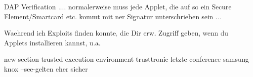 DAP Verification .... normalerweise muss jede Applet, die auf so ein Secure Element/Smartcard etc. kommt mit ner Signatur unterschrieben sein ...


Waehrend ich Exploits finden konnte, die Dir erw. Zugriff geben, wenn du Applets installieren kannst, u.a.



new section trusted execution environment
trusttronic letzte conference
samsung knox
--see-gelten eher sicher
